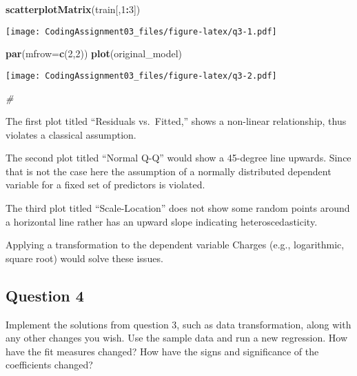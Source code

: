 \documentclass[
]{article}
\newenvironment{Shaded}{\begin{snugshade}}{\end{snugshade}}
\newcommand{\AttributeTok}[1]{\textcolor[rgb]{0.13,0.29,0.53}{#1}}
\newcommand{\CommentTok}[1]{\textcolor[rgb]{0.56,0.35,0.01}{\textit{#1}}}
\newcommand{\DecValTok}[1]{\textcolor[rgb]{0.00,0.00,0.81}{#1}}
\newcommand{\FunctionTok}[1]{\textcolor[rgb]{0.13,0.29,0.53}{\textbf{#1}}}
\newcommand{\NormalTok}[1]{#1}
\newcommand{\SpecialCharTok}[1]{\textcolor[rgb]{0.81,0.36,0.00}{\textbf{#1}}}
\begin{document}
\begin{Shaded}
\begin{Highlighting}[]
\FunctionTok{scatterplotMatrix}\NormalTok{(train[,}\DecValTok{1}\SpecialCharTok{:}\DecValTok{3}\NormalTok{])}
\end{Highlighting}
\end{Shaded}

\texttt{[image: CodingAssignment03\_files/figure-latex/q3-1.pdf]}

\begin{Shaded}
\begin{Highlighting}[]
\FunctionTok{par}\NormalTok{(}\AttributeTok{mfrow=}\FunctionTok{c}\NormalTok{(}\DecValTok{2}\NormalTok{,}\DecValTok{2}\NormalTok{))}
\FunctionTok{plot}\NormalTok{(original\_model)}
\end{Highlighting}
\end{Shaded}

\texttt{[image: CodingAssignment03\_files/figure-latex/q3-2.pdf]}

\begin{Shaded}
\begin{Highlighting}[]
\CommentTok{\#}
\end{Highlighting}
\end{Shaded}

The first plot titled ``Residuals vs.~Fitted,'' shows a non-linear
relationship, thus violates a classical assumption.

The second plot titled ``Normal Q-Q'' would show a 45-degree line
upwards. Since that is not the case here the assumption of a normally
distributed dependent variable for a fixed set of predictors is
violated.

The third plot titled ``Scale-Location'' does not show some random
points around a horizontal line rather has an upward slope indicating
heteroscedasticity.

Applying a transformation to the dependent variable Charges (e.g.,
logarithmic, square root) would solve these issues.

\subsection{Question 4}\label{question-4}

Implement the solutions from question 3, such as data transformation,
along with any other changes you wish. Use the sample data and run a new
regression. How have the fit measures changed? How have the signs and
significance of the coefficients changed?
\end{document}
